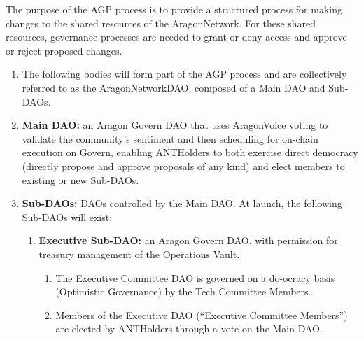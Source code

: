 
\label{chap:AGPProcess}

The purpose of the \acf{AGP} process is to provide a structured process for making changes to the shared resources of the \gls{AragonNetwork}.
For these shared resources, governance processes are needed to grant or deny access and approve or reject proposed changes.

\begin{enumerate}
	
	\begin{enumerate}
		
		\item The following bodies will form part of the \ac{AGP} process and are collectively referred to as the \gls{AragonNetworkDAO}, composed of a Main \ac{DAO} and Sub-\acp{DAO}.
		\item \textbf{Main \ac{DAO}:} an Aragon Govern \ac{DAO} that uses \gls{AragonVoice} voting to validate the community’s sentiment and then scheduling for on-chain execution on Govern, enabling \glspl{ANTHolder} to both exercise direct democracy (directly propose and approve proposals of any kind) and elect members to existing or new Sub-\acp{DAO}.
		\item \textbf{Sub-\acp{DAO}:} \acp{DAO} controlled by the Main \ac{DAO}.
		At launch, the following Sub-\acp{DAO} will exist:
		\begin{enumerate}
			
			\item \textbf{Executive Sub-\ac{DAO}:} an Aragon Govern \ac{DAO}, with permission for treasury management of the Operations Vault.
			\begin{enumerate}
				\item The Executive Committee \ac{DAO} is governed on a do-ocracy basis (Optimistic Governance) by the Tech Committee Members.
				\item Members of the Executive \ac{DAO} (``Executive Committee Members'') are elected by \glspl{ANTHolder} through a vote on the Main \ac{DAO}.
			\end{enumerate}
		

\end{enumerate}
\end{enumerate}
\end{enumerate}
